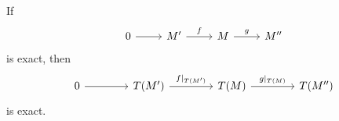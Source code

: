 If
\[\begin{tikzcd}
	0\ar[r] & M'\ar[r, "f"] & M\ar[r, "g"] & M''
\end{tikzcd}\]
is exact, then
\[\begin{tikzcd}[column sep=1.4cm]
	0\ar[r] & T(M')\ar[r, "f|_{T(M')}"] & T(M)\ar[r, "g|_{T(M)}"] & T(M'')
\end{tikzcd}\]
is exact.
